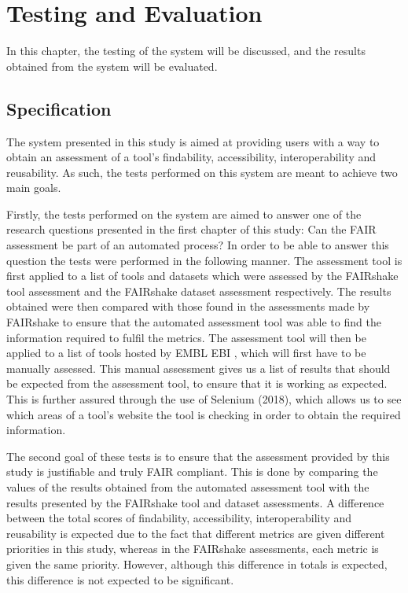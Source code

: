 \documentclass{cisfyp}
\begin{document}
\chapter{Testing and Evaluation}
In this chapter, the testing of the system will be discussed, and the results obtained from the system will be evaluated. 

\section{Specification}
The system presented in this study is aimed at providing users with a way to obtain an assessment of a tool's findability, accessibility, interoperability and reusability. As such, the tests performed on this system are meant to achieve two main goals.

Firstly, the tests performed on the system are aimed to answer one of the research questions presented in the first chapter of this study: Can the FAIR assessment be part of an automated process? In order to be able to answer this question the tests were performed in the following manner. The assessment tool is first applied to a list of tools and datasets which were assessed by the FAIRshake tool assessment and the FAIRshake dataset assessment respectively. The results obtained were then compared with those found in the assessments made by FAIRshake to ensure that the automated assessment tool was able to find the information required to fulfil the metrics. The assessment tool will then be applied to a list of tools hosted by EMBL EBI \cite{ebi}, which will first have to be manually assessed. This manual assessment gives us a list of results that should be expected from the assessment tool, to ensure that it is working as expected. This is further assured through the use of Selenium (2018), which allows us to see which areas of a tool's website the tool is checking in order to obtain the required information.

The second goal of these tests is to ensure that the assessment provided by this study is justifiable and truly FAIR compliant. This is done by comparing the values of the results obtained from the automated assessment tool with the results presented by the FAIRshake tool and dataset assessments. A difference between the total scores of findability, accessibility, interoperability and reusability is expected due to the fact that different metrics are given different priorities in this study, whereas in the FAIRshake assessments, each metric is given the same priority. However, although this difference in totals is expected, this difference is not expected to be significant.
\end{document}
